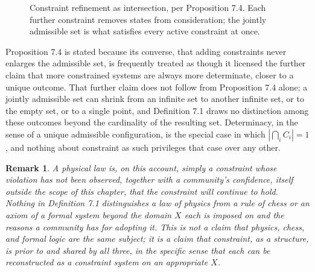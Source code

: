 \documentclass[11pt]{book}
\newtheorem{remark}[theorem]{Remark}
\begin{document}
\begin{figure}[htb]
\centering
{}
\caption{Constraint refinement as intersection, per Proposition 7.4. Each further constraint removes states from consideration; the jointly admissible set is what satisfies every active constraint at once.}
\label{fig:constraint-intersection}
\end{figure}

Proposition 7.4 is stated because its converse, that adding constraints never enlarges the admissible set, is frequently treated as though it licensed the further claim that more constrained systems are always more determinate, closer to a unique outcome. That further claim does not follow from Proposition 7.4 alone; a jointly admissible set can shrink from an infinite set to another infinite set, or to the empty set, or to a single point, and Definition 7.1 draws no distinction among these outcomes beyond the cardinality of the resulting set. Determinacy, in the sense of a unique admissible configuration, is the special case in which $|\bigcap_i C_i| = 1$, and nothing about constraint as such privileges that case over any other.

\begin{remark}
A physical law is, on this account, simply a constraint whose violation has not been observed, together with a community's confidence, itself outside the scope of this chapter, that the constraint will continue to hold. Nothing in Definition 7.1 distinguishes a law of physics from a rule of chess or an axiom of a formal system beyond the domain $X$ each is imposed on and the reasons a community has for adopting it. This is not a claim that physics, chess, and formal logic are the same subject; it is a claim that constraint, as a structure, is prior to and shared by all three, in the specific sense that each can be reconstructed as a constraint system on an appropriate $X$.
\end{remark}
\end{document}

